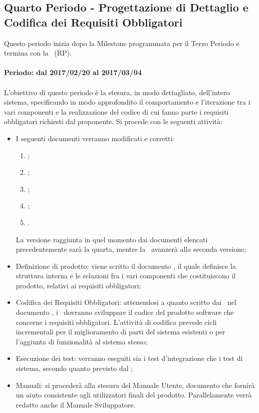 \documentclass[../PianoDiProgetto.tex]{subfiles}
\begin{document}
\subsection{Quarto Periodo - Progettazione di Dettaglio e Codifica dei Requisiti Obbligatori}
	Questo periodo inizia dopo la Milestone programmata per il Terzo Periodo e termina con la \revisionediprogettazione\ (RP).
	\\
	\\
	\textbf{Periodo: dal 2017/02/20 al 2017/03/04}
	\\
	\\
	L'obiettivo di questo periodo è la stesura, in modo dettagliato, dell'intero sistema, specificando in modo approfondito il comportamento e l'iterazione tra i vari componenti e la realizzazione del codice di cui fanno parte i requisiti obbligatori richiesti dal proponente.
	Si procede con le seguenti attività:
	\begin{itemize}
		\item I seguenti documenti verranno modificati e corretti:
			\begin{enumerate}
				\item \normediprogetto;
				\item \analisideirequisiti;
				\item \pianodiqualifica;
				\item \pianodiprogetto;
				\item \glossario.
			\end{enumerate}
		La versione raggiunta in quel momento dai documenti elencati precedentemente sarà la quarta, mentre la \specificatecnica\ avanzerà alla seconda versione;
		\item Definizione di prodotto: viene scritto il documento , il quale definisce la struttura interna e le relazioni fra i vari componenti che costituiscono il prodotto, relativi ai requisiti obbligatori;
		\item Codifica dei Requisiti Obbligatori: attenendosi a quanto scritto dai \progettisti\ nel documento , i \programmatori\ dovranno sviluppare il codice del prodotto software che concerne i requisiti obbligatori. L'attività di codifica prevede cicli incrementali per il miglioramento di parti del sistema esistenti o per l'aggiunta di funzionalità al sistema stesso;
		\item Esecuzione dei test: verranno eseguiti sia i test d'integrazione che i test di sistema, secondo quanto previsto dal \pianodiqualifica;
		\item Manuali: si procederà alla stesura del Manuale Utente, documento che fornirà un aiuto consistente agli utilizzatori finali del prodotto. Parallelamente verrà redatto anche il Manuale Sviluppatore.
	\end{itemize}
	
\end{document}
